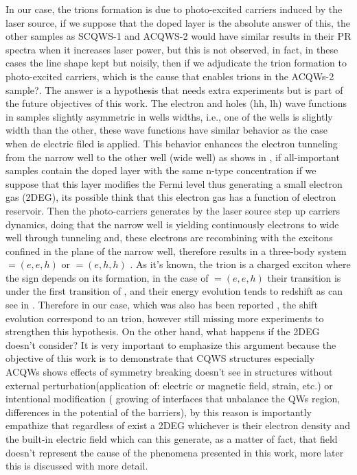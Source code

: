 In our case, the trions formation is due to photo-excited carriers induced by the laser source, if we suppose that the doped layer is the absolute answer of this, the other samples as SCQWS-1 and ACQWS-2 would have similar results in their PR spectra when it increases laser power, but this is not observed, in fact, in these cases the line shape kept but noisily, then if we adjudicate the trion formation to photo-excited carriers, which is the cause that enables trions in the ACQWs-2 sample?. The answer is a hypothesis that needs extra experiments but is part of the future objectives of this work. The electron and holes (hh, lh) wave functions in samples slightly asymmetric in wells widths, i.e., one of the wells is slightly width than the other, these wave functions have similar behavior as the case when de electric filed is applied. This behavior enhances the electron tunneling from the narrow well to the other well (wide well) as shows in , if all-important samples contain the doped layer with the same n-type concentration if we suppose that this layer modifies the Fermi level thus generating a small electron gas (2DEG), its possible think that this electron gas has a function of electron reservoir\cite{manassen1996exciton,finkelstein1996negatively}.  Then the photo-carriers generates by the laser source step up carriers dynamics, doing that the narrow well is yielding continuously electrons to wide well through tunneling and, these electrons are recombining with the excitons confined in the plane of the narrow well, therefore results in a three-body system  \xm$=(e,e,h)$ or  \xp$=(e,h,h)$ . As it's known, the trion is a charged exciton where the sign depends on its formation, in the case of \xm$=(e,e,h)$  their transition is under the first transition of \xhh, and their energy evolution tends to redshift as can see in . Therefore in our case, which was also has been reported 
\cite{sibeldin2001formation,israel2005trions,manassen1996exciton,kheng1993observation,finkelstein1996negatively}, the shift evolution correspond to an \xm trion, however still missing more experiments to strengthen this hypothesis. On the other hand, what happens if the 2DEG doesn't consider? 
It is very important to emphasize this argument because the objective of this work is to demonstrate that CQWS structures especially ACQWs shows effects of symmetry breaking doesn't see in structures without external perturbation(application of:  electric or magnetic field,  strain, etc.) or intentional modification ( growing of interfaces that unbalance the QWs region, differences in the potential of the barriers), by this reason is importantly empathize that regardless of exist a 2DEG whichever is their electron density and the built-in electric field which can this generate, as a matter of fact,  that field doesn't represent the cause of the phenomena presented in this work, more later this is discussed with more detail. 
